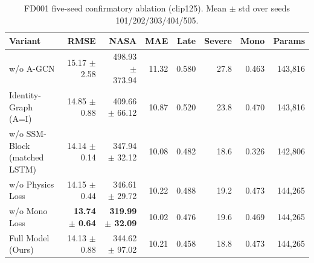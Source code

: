\begin{table}[t]
\centering
\caption{FD001 five-seed confirmatory ablation (clip125). Mean $\pm$ std over seeds 101/202/303/404/505.}
\label{tab:fd001-ablation}
\begin{tabular}{lrrrrrrr}
\toprule
Variant & RMSE & NASA & MAE & Late & Severe & Mono & Params \\
\midrule
w/o A-GCN & 15.17 $\pm$ 2.58 & 498.93 $\pm$ 373.94 & 11.32 & 0.580 & 27.8 & 0.463 & 143,816 \\
Identity-Graph (A=I) & 14.85 $\pm$ 0.88 & 409.66 $\pm$ 66.12 & 10.87 & 0.520 & 23.8 & 0.470 & 143,816 \\
w/o SSM-Block (matched LSTM) & 14.14 $\pm$ 0.14 & 347.94 $\pm$ 32.12 & 10.08 & 0.482 & 18.6 & 0.326 & 142,806 \\
w/o Physics Loss & 14.15 $\pm$ 0.44 & 346.61 $\pm$ 29.72 & 10.22 & 0.488 & 19.2 & 0.473 & 144,265 \\
w/o Mono Loss & \textbf{13.74 $\pm$ 0.64} & \textbf{319.99 $\pm$ 32.09} & 10.02 & 0.476 & 19.6 & 0.469 & 144,265 \\
Full Model (Ours) & 14.13 $\pm$ 0.88 & 344.62 $\pm$ 97.02 & 10.21 & 0.458 & 18.8 & 0.473 & 144,265 \\
\bottomrule
\end{tabular}
\end{table}
